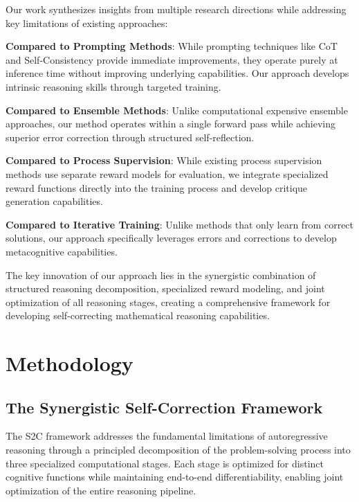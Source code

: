 \documentclass[10pt,twocolumn]{article}
\newcommand{\ssc}{\textsc{S2C}}
\begin{document}
Our work synthesizes insights from multiple research directions while addressing key limitations of existing approaches:

\textbf{Compared to Prompting Methods}: While prompting techniques like CoT and Self-Consistency provide immediate improvements, they operate purely at inference time without improving underlying capabilities. Our approach develops intrinsic reasoning skills through targeted training.

\textbf{Compared to Ensemble Methods}: Unlike computational expensive ensemble approaches, our method operates within a single forward pass while achieving superior error correction through structured self-reflection.

\textbf{Compared to Process Supervision}: While existing process supervision methods use separate reward models for evaluation, we integrate specialized reward functions directly into the training process and develop critique generation capabilities.

\textbf{Compared to Iterative Training}: Unlike methods that only learn from correct solutions, our approach specifically leverages errors and corrections to develop metacognitive capabilities.

The key innovation of our approach lies in the synergistic combination of structured reasoning decomposition, specialized reward modeling, and joint optimization of all reasoning stages, creating a comprehensive framework for developing self-correcting mathematical reasoning capabilities.

\section{Methodology} \label{sec:methodology}

\subsection{The Synergistic Self-Correction Framework}

The \ssc{} framework addresses the fundamental limitations of autoregressive reasoning through a principled decomposition of the problem-solving process into three specialized computational stages. Each stage is optimized for distinct cognitive functions while maintaining end-to-end differentiability, enabling joint optimization of the entire reasoning pipeline.
\end{document}
